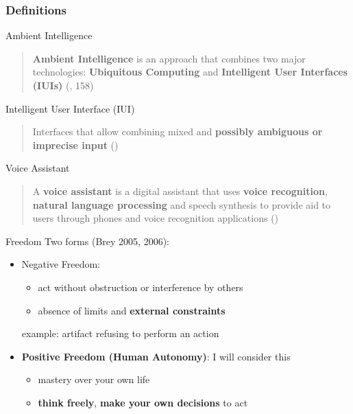 \documentclass{beamer}
\begin{document}
\begin{frame}[allowframebreaks]
\frametitle{Definitions}	
	\begin{block}{Ambient Intelligence}
		\begin{quote}
			\textbf{Ambient Intelligence} is an approach that combines two major technologies: \textbf{Ubiquitous Computing} and \textbf{Intelligent User Interfaces (IUIs)} (\cite{brey2005freedom}, 158)
		\end{quote}
	\end{block}

	\begin{block}{Intelligent User Interface (IUI)}
		\begin{quote}
			Interfaces that allow combining mixed and \textbf{possibly ambiguous or imprecise input} (\cite{brey2005freedom})
		\end{quote}
	\end{block}

	\begin{block}{Voice Assistant}
		\begin{quote}
			A \textbf{voice assistant} is a digital assistant that uses \textbf{voice recognition}, \textbf{natural language processing} and speech synthesis to provide aid to users through phones and voice recognition applications (\cite{whatis})
		\end{quote}
	\end{block}
	\framebreak
	\begin{block}{Freedom}
		   Two forms (Brey 2005, 2006):
		   
			\begin{itemize}
				\item Negative Freedom:
					\begin{itemize}
						\item act without obstruction or interference by others
						\item absence of limits and \textbf{external constraints}
					\end{itemize}
				\smallskip
				example: artifact refusing to perform an action
				    \bigskip
					\item {\small \textbf{Positive Freedom (Human Autonomy)}: I will consider this}
						\begin{itemize}
							\item mastery over your own life
							\item \textbf{think freely}, \textbf{make your own decisions} to act
						\end{itemize}
			\end{itemize}
		
	\end{block}
\end{frame}
\end{document}
